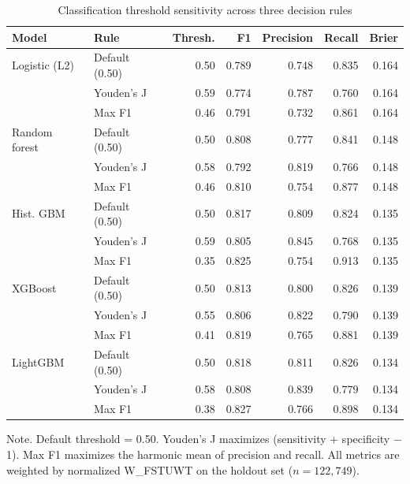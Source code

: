 \begin{table}[htp]
\centering
\small
\caption{Classification threshold sensitivity across three decision rules\label{tab:threshold}}
\begin{tabular}{@{}llrrrrr@{}}
\toprule
\textbf{Model} & \textbf{Rule} & \textbf{Thresh.} & \textbf{F1} & \textbf{Precision} & \textbf{Recall} & \textbf{Brier} \\
\midrule
  Logistic (L2) & Default (0.50) & 0.50 & 0.789 & 0.748 & 0.835 & 0.164 \\
   & Youden's J & 0.59 & 0.774 & 0.787 & 0.760 & 0.164 \\
   & Max F1 & 0.46 & 0.791 & 0.732 & 0.861 & 0.164 \\
  \addlinespace
  Random forest & Default (0.50) & 0.50 & 0.808 & 0.777 & 0.841 & 0.148 \\
   & Youden's J & 0.58 & 0.792 & 0.819 & 0.766 & 0.148 \\
   & Max F1 & 0.46 & 0.810 & 0.754 & 0.877 & 0.148 \\
  \addlinespace
  Hist. GBM & Default (0.50) & 0.50 & 0.817 & 0.809 & 0.824 & 0.135 \\
   & Youden's J & 0.59 & 0.805 & 0.845 & 0.768 & 0.135 \\
   & Max F1 & 0.35 & 0.825 & 0.754 & 0.913 & 0.135 \\
  \addlinespace
  XGBoost & Default (0.50) & 0.50 & 0.813 & 0.800 & 0.826 & 0.139 \\
   & Youden's J & 0.55 & 0.806 & 0.822 & 0.790 & 0.139 \\
   & Max F1 & 0.41 & 0.819 & 0.765 & 0.881 & 0.139 \\
  \addlinespace
  LightGBM & Default (0.50) & 0.50 & 0.818 & 0.811 & 0.826 & 0.134 \\
   & Youden's J & 0.58 & 0.808 & 0.839 & 0.779 & 0.134 \\
   & Max F1 & 0.38 & 0.827 & 0.766 & 0.898 & 0.134 \\
\bottomrule
\end{tabular}
\begin{tablenotes}
\item Note. Default threshold = 0.50. Youden's J maximizes (sensitivity + specificity $-$ 1). Max F1 maximizes the harmonic mean of precision and recall. All metrics are weighted by normalized W\_FSTUWT on the holdout set ($n = 122{,}749$).
\end{tablenotes}
\end{table}

